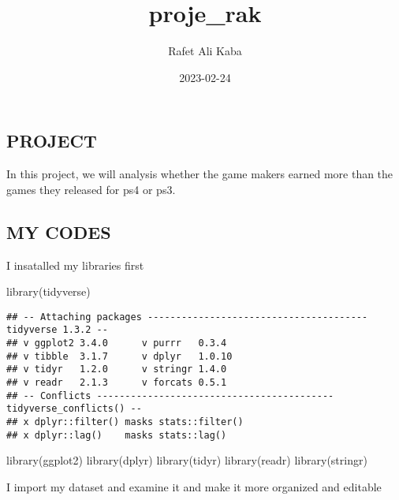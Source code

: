 \documentclass[
]{article}
\title{proje\_rak}
\author{Rafet Ali Kaba}
\date{2023-02-24}
\newenvironment{Shaded}{\begin{snugshade}}{\end{snugshade}}
\newcommand{\FunctionTok}[1]{\textcolor[rgb]{0.00,0.00,0.00}{#1}}
\newcommand{\NormalTok}[1]{#1}
\begin{document}
\maketitle

\hypertarget{project}{%
\subsection{PROJECT}\label{project}}

In this project, we will analysis whether the game makers earned more
than the games they released for ps4 or ps3.

\hypertarget{my-codes}{%
\subsection{MY CODES}\label{my-codes}}

I insatalled my libraries first

\begin{Shaded}
\begin{Highlighting}[]
\FunctionTok{library}\NormalTok{(tidyverse)}
\end{Highlighting}
\end{Shaded}

\begin{verbatim}
## -- Attaching packages --------------------------------------- tidyverse 1.3.2 --
## v ggplot2 3.4.0      v purrr   0.3.4 
## v tibble  3.1.7      v dplyr   1.0.10
## v tidyr   1.2.0      v stringr 1.4.0 
## v readr   2.1.3      v forcats 0.5.1 
## -- Conflicts ------------------------------------------ tidyverse_conflicts() --
## x dplyr::filter() masks stats::filter()
## x dplyr::lag()    masks stats::lag()
\end{verbatim}

\begin{Shaded}
\begin{Highlighting}[]
\FunctionTok{library}\NormalTok{(ggplot2)}
\FunctionTok{library}\NormalTok{(dplyr)}
\FunctionTok{library}\NormalTok{(tidyr)}
\FunctionTok{library}\NormalTok{(readr)}
\FunctionTok{library}\NormalTok{(stringr)}
\end{Highlighting}
\end{Shaded}

I import my dataset and examine it and make it more organized and
editable
\end{document}
